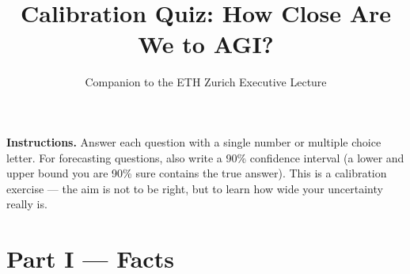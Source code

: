 \documentclass[11pt,a4paper]{article}
\title{Calibration Quiz: How Close Are We to AGI?}
\author{Companion to the ETH Zurich Executive Lecture}
\date{}
\begin{document}
\maketitle

\noindent\textbf{Instructions.}
Answer each question with a single number or multiple choice letter.
For forecasting questions, also write a 90\% confidence interval (a lower and upper
bound you are 90\% sure contains the true answer). This is a calibration
exercise --- the aim is not to be right, but to learn how wide your uncertainty
really is.

\vspace{1em}

\section*{Part I --- Facts}
\end{document}
